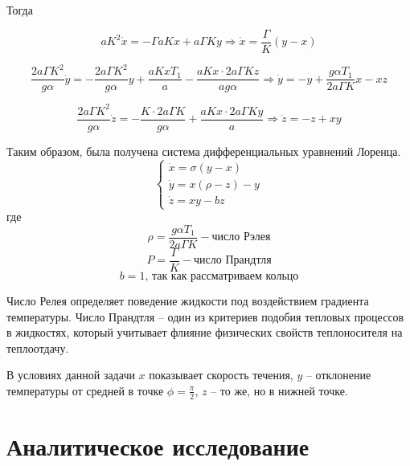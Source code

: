 \documentclass[12pt]{article}
\begin{document}
Тогда

\begin{equation*}
aK^2\dot{x} = -\Gamma aKx + a\Gamma Ky \Longrightarrow \dot{x} = \frac{\Gamma}{K} (y - x)
\end{equation*}

\begin{equation*}
\frac{2a\Gamma K^2}{g\alpha} \dot{y} = -\frac{2a\Gamma K^2}{g\alpha}y + \frac{aKxT_1}{a} - \frac{aKx \cdot 2a \Gamma Kz}{ag\alpha} \Longrightarrow \dot{y} = -y + \frac{g\alpha T_1}{2a\Gamma K}x - xz
\end{equation*}

\begin{equation*}
\frac{2a\Gamma K^2}{g\alpha} \dot{z} = -\frac{K \cdot 2a\Gamma K}{g\alpha} + \frac{aKx \cdot 2a\Gamma Ky}{a} \Longrightarrow \dot{z} = -z+xy
\end{equation*}


Таким образом, была получена система дифференциальных уравнений Лоренца.
$$\begin{cases}	
	\dot{x} = \sigma (y-x) \\
	\dot{y} = x(\rho-z)-y \\
	\dot{z} = xy-bz
\end{cases}$$
где 
\[ \rho = \frac{g\alpha T_1}{2a\Gamma K} - \text{число Рэлея}\]
\[P = \frac{\Gamma}{K} - \text{число Прандтля}\] 
\[b = 1 \text{, так как рассматриваем кольцо}\]

Число Релея определяет поведение жидкости под воздействием градиента температуры. Число Прандтля -- один из критериев подобия тепловых процессов в жидкостях, который учитывает флияние физических свойств теплоносителя на теплоотдачу.

В условиях данной задачи $x$ показывает скорость течения, $y$ -- отклонение температуры от средней в точке $\phi = \frac{\pi}{2}$, $z$ -- то же, но в нижней точке.

\section{Аналитическое исследование}
\end{document}
